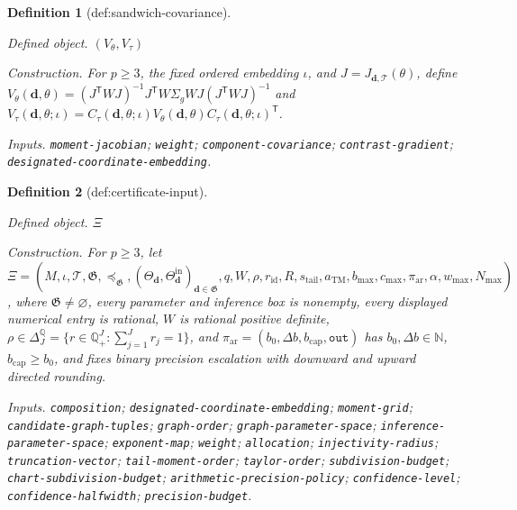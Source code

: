 \documentclass{article}
\newtheorem{definition}{Definition}
\begin{document}
\begin{definition}[def:sandwich-covariance]\label{def:sandwich-covariance}
\par\smallskip\noindent\emph{Defined object.} \((V_\theta,V_\tau)\)
\par\smallskip\noindent\emph{Construction.} For \(p\geq3\), the fixed ordered embedding \(\iota\), and \(J=J_{\boldsymbol d,\mathcal T}(\theta)\), define \(V_\theta(\boldsymbol d,\theta)=(J^{\mathsf T}WJ)^{-1}J^{\mathsf T}W\Sigma_gWJ(J^{\mathsf T}WJ)^{-1}\) and \(V_\tau(\boldsymbol d,\theta;\iota)=C_\tau(\boldsymbol d,\theta;\iota)V_\theta(\boldsymbol d,\theta)C_\tau(\boldsymbol d,\theta;\iota)^{\mathsf T}\).
\par\smallskip\noindent\emph{Inputs.} \texttt{moment-\allowbreak{}jacobian}; \texttt{weight}; \texttt{component-\allowbreak{}covariance}; \texttt{contrast-\allowbreak{}gradient}; \texttt{designated-\allowbreak{}coordinate-\allowbreak{}embedding}.
\end{definition}

\begin{definition}[def:certificate-input]\label{def:certificate-input}
\par\smallskip\noindent\emph{Defined object.} \(\Xi\)
\par\smallskip\noindent\emph{Construction.} For \(p\geq3\), let \(\Xi=(M,\iota,\mathcal T,\mathfrak G,\preceq_{\mathfrak G},(\Theta_{\boldsymbol d},\Theta^{\mathrm{in}}_{\boldsymbol d})_{\boldsymbol d\in\mathfrak G},q,W,\rho,r_{\mathrm{id}},R,s_{\mathrm{tail}},a_{\mathrm{TM}},b_{\max},c_{\max},\pi_{\mathrm{ar}},\alpha,w_{\max},N_{\max})\), where \(\mathfrak G\neq\varnothing\), every parameter and inference box is nonempty, every displayed numerical entry is rational, \(W\) is rational positive definite, \(\rho\in\Delta_J^{\mathbb Q}=\{r\in\mathbb Q_+^J:\sum_{j=1}^{J}r_j=1\}\), and \(\pi_{\mathrm{ar}}=(b_0,\Delta b,b_{\mathrm{cap}},\mathtt{out})\) has \(b_0,\Delta b\in\mathbb N\), \(b_{\mathrm{cap}}\geq b_0\), and fixes binary precision escalation with downward and upward directed rounding.
\par\smallskip\noindent\emph{Inputs.} \texttt{composition}; \texttt{designated-\allowbreak{}coordinate-\allowbreak{}embedding}; \texttt{moment-\allowbreak{}grid}; \texttt{candidate-\allowbreak{}graph-\allowbreak{}tuples}; \texttt{graph-\allowbreak{}order}; \texttt{graph-\allowbreak{}parameter-\allowbreak{}space}; \texttt{inference-\allowbreak{}parameter-\allowbreak{}space}; \texttt{exponent-\allowbreak{}map}; \texttt{weight}; \texttt{allocation}; \texttt{injectivity-\allowbreak{}radius}; \texttt{truncation-\allowbreak{}vector}; \texttt{tail-\allowbreak{}moment-\allowbreak{}order}; \texttt{taylor-\allowbreak{}order}; \texttt{subdivision-\allowbreak{}budget}; \texttt{chart-\allowbreak{}subdivision-\allowbreak{}budget}; \texttt{arithmetic-\allowbreak{}precision-\allowbreak{}policy}; \texttt{confidence-\allowbreak{}level}; \texttt{confidence-\allowbreak{}halfwidth}; \texttt{precision-\allowbreak{}budget}.
\end{definition}
\end{document}
